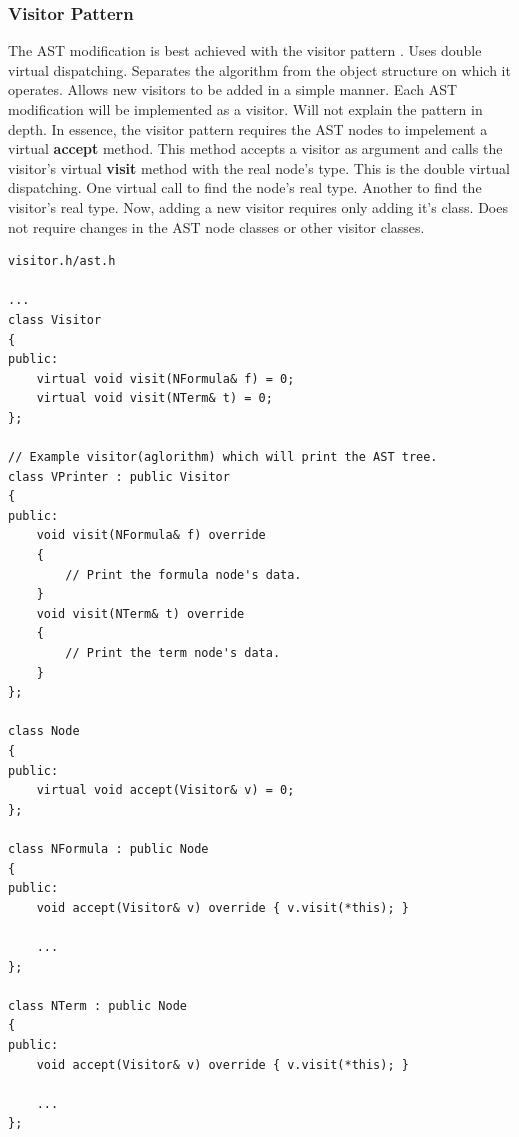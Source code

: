 \documentclass{article}
\begin{document}

	\subsubsection{Visitor Pattern} The AST modification is best achieved with the visitor pattern \cite{visitor-pattern}. Uses double virtual dispatching. Separates the algorithm from the object structure on which it operates. Allows new visitors to be added in a simple manner. Each AST modification will be implemented as a visitor. Will not explain the pattern in depth. In essence, the visitor pattern requires the AST nodes to impelement a virtual \textbf{accept} method. This method accepts a visitor as argument and calls the visitor's virtual \textbf{visit} method with the real node's type. This is the double virtual dispatching. One virtual call to find the node's real type. Another to find the visitor's real type. Now, adding a new visitor requires only adding it's class. Does not require changes in the AST node classes or other visitor classes.

\newpage
\begin{lstlisting}
visitor.h/ast.h

...
class Visitor
{
public:
    virtual void visit(NFormula& f) = 0;
    virtual void visit(NTerm& t) = 0;
};

// Example visitor(aglorithm) which will print the AST tree.
class VPrinter : public Visitor
{
public:
    void visit(NFormula& f) override
    {
        // Print the formula node's data.
    }
    void visit(NTerm& t) override
    {
        // Print the term node's data.
    }
};

class Node
{
public:
    virtual void accept(Visitor& v) = 0;
};

class NFormula : public Node
{
public:
    void accept(Visitor& v) override { v.visit(*this); }

    ...
};

class NTerm : public Node
{
public:
    void accept(Visitor& v) override { v.visit(*this); }

    ...
};
\end{lstlisting}
\end{document}
